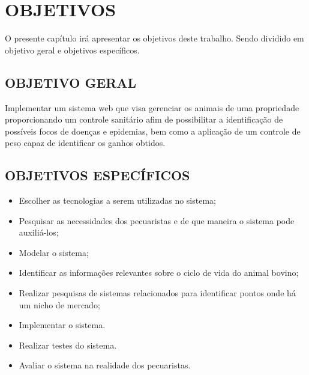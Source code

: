 %
%



\section{OBJETIVOS}

O presente capítulo irá apresentar os objetivos deste trabalho. Sendo dividido em objetivo geral e objetivos específicos.

\subsection{OBJETIVO GERAL}

Implementar um sistema web que visa gerenciar os animais de uma propriedade proporcionando um controle sanitário afim de possibilitar a identificação de possíveis focos de doenças e epidemias, bem como a aplicação de um controle de peso capaz de identificar os ganhos obtidos.

\subsection{OBJETIVOS ESPECÍFICOS}

\begin{itemize}
	\item Escolher as tecnologias a serem utilizadas no sistema;
	\item Pesquisar as necessidades dos pecuaristas e de que maneira o sistema pode auxiliá-los;
	\item Modelar o sistema;
	\item Identificar as informações relevantes sobre o ciclo de vida do animal bovino;
	\item Realizar pesquisas de sistemas relacionados para identificar pontos onde há um nicho de mercado;
	\item Implementar o sistema.
	\item Realizar testes do sistema.
	\item Avaliar o sistema na realidade dos pecuaristas.
\end{itemize}
